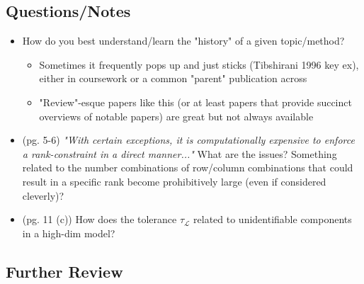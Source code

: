 \documentclass[11pt]{article}
\begin{document}
\subsection*{Questions/Notes}

	\begin{itemize}
		\item How do you best understand/learn the "history" of a given topic/method?
		\begin{itemize}
			\item Sometimes it frequently pops up and just sticks (Tibshirani 1996 key ex), either in coursework or a common "parent" publication across 
			\item "Review"-esque papers like this (or at least papers that provide succinct overviews of notable papers) are great but not always available
        \end{itemize}
        \item (pg. 5-6) {\it "With certain exceptions, it is computationally expensive to enforce a rank-constraint in a direct manner..."} What are the issues? Something related to the number combinations of row/column combinations that could result in a specific rank become prohibitively large (even if considered cleverly)? 
		\item (pg. 11 (c)) How does the tolerance $\tau_\mathcal{L}$ related to unidentifiable components in a high-dim model? 
	\end{itemize}

\subsection*{Further Review}
\end{document}
